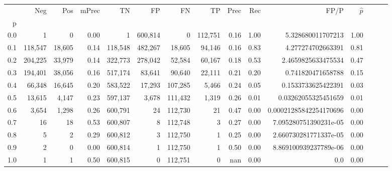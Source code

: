 \begin{tabular}{rrrrrrrrrrrrrrr}
\toprule
{} &      Neg &     Pos & mPrec &       TN &       FP &       FN &       TP &  Prec &   Rec &                    FP/P & $\hat{p}$ \\
p   &          &         &       &          &          &          &          &       &       &                         &           \\
\midrule
0.0 &        1 &       0 &  0.00 &        1 &  600,814 &        0 &  112,751 &  0.16 &  1.00 &       5.328680011707213 &      1.00 \\
0.1 &  118,547 &  18,605 &  0.14 &  118,548 &  482,267 &   18,605 &   94,146 &  0.16 &  0.83 &       4.277274702663391 &      0.81 \\
0.2 &  204,225 &  33,979 &  0.14 &  322,773 &  278,042 &   52,584 &   60,167 &  0.18 &  0.53 &      2.4659825633475534 &      0.47 \\
0.3 &  194,401 &  38,056 &  0.16 &  517,174 &   83,641 &   90,640 &   22,111 &  0.21 &  0.20 &       0.741820471658788 &      0.15 \\
0.4 &   66,348 &  16,645 &  0.20 &  583,522 &   17,293 &  107,285 &    5,466 &  0.24 &  0.05 &      0.1533733625422391 &      0.03 \\
0.5 &   13,615 &   4,147 &  0.23 &  597,137 &    3,678 &  111,432 &    1,319 &  0.26 &  0.01 &     0.03262055325451659 &      0.01 \\
0.6 &    3,654 &   1,298 &  0.26 &  600,791 &       24 &  112,730 &       21 &  0.47 &  0.00 &  0.00021285842254170696 &      0.00 \\
0.7 &       16 &      18 &  0.53 &  600,807 &        8 &  112,748 &        3 &  0.27 &  0.00 &   7.095280751390231e-05 &      0.00 \\
0.8 &        5 &       2 &  0.29 &  600,812 &        3 &  112,750 &        1 &  0.25 &  0.00 &   2.660730281771337e-05 &      0.00 \\
0.9 &        2 &       0 &  0.00 &  600,814 &        1 &  112,750 &        1 &  0.50 &  0.00 &   8.869100939237789e-06 &      0.00 \\
1.0 &        1 &       1 &  0.50 &  600,815 &        0 &  112,751 &        0 &   nan &  0.00 &                     0.0 &      0.00 \\
\bottomrule
\end{tabular}
